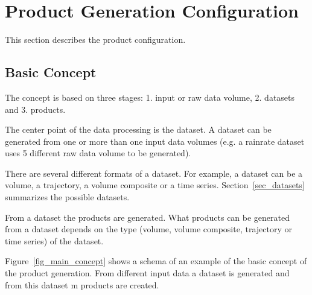 \documentclass[a4paper,11pt,pdftex,twoside]{scrartcl}
\begin{document}
{{{\newpage

\section{Product Generation Configuration}
\label{sec_products}

This section describes the product configuration.

\subsection{Basic Concept}

The concept is based on three stages: 1. input or raw data volume, 2. datasets
and 3. products.

The center point of the data processing is the dataset. A dataset can be
generated from one or more than one input data volumes (e.g. a rainrate dataset
uses 5 different raw data volume to be generated).

There are several different formats of a dataset. For example, a dataset can be a
volume, a trajectory, a volume composite or a time series.
Section~\ref{sec_datasets} summarizes the possible datasets.

From a dataset the products are generated. What products can be generated from
a dataset depends on the type (volume, volume composite, trajectory or
time series) of the dataset.

Figure~\ref{fig_main_concept} shows a schema of an example of the basic concept
of the product generation. From different input data a dataset
is generated and from this dataset m products are created.

}}}
\end{document}
